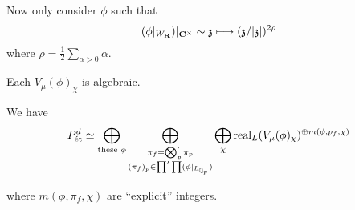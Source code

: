 Now only consider $\phi$ such that
\[
	(\phi|_{W_\R})|_{\C^{\times }} \sim \kz \mapsto (\kz / |\kz|)^{2\rho}
\] 
where $\rho = \frac{1}{2}\sum_{\alpha > 0}\alpha$.
\begin{lemma}
	Each $V_\mu(\phi)_\chi$ is algebraic.
\end{lemma}
\begin{conjecture}
	We have
	\[
		P^{d}_{\text{\'et}} \simeq \bigoplus_{\text{these }\phi}\bigoplus_{\substack{\pi_f = \bigotimes_p'\pi_p \\ (\pi_f)_p\in \prod'\prod(\phi|_{L_{\mathbb Q_p}})}} \bigoplus_{\chi}\operatorname{real}_L(V_\mu(\phi)_\chi)^{\oplus m(\phi,p_f,\chi)}
	\] 
\end{conjecture}
where $m(\phi,\pi_f,\chi)$ are ``explicit'' integers.


